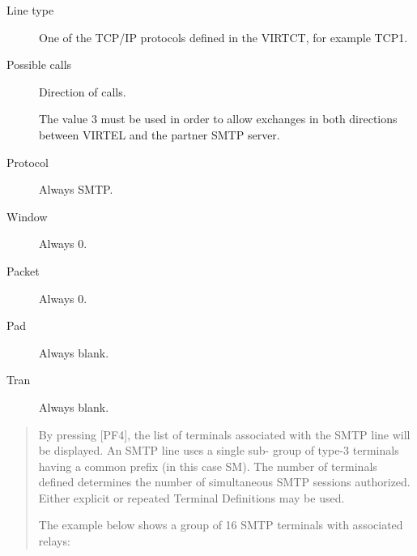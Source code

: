 \documentclass[letterpaper,10pt,english]{sphinxmanual}
\begin{document}
\begin{description}
\item[{Line type}] \leavevmode
One of the TCP/IP protocols defined in the VIRTCT, for example TCP1.

\item[{Possible calls}] \leavevmode
Direction of calls.

The value 3 must be used in order to allow exchanges in both directions between VIRTEL and the partner SMTP server.

\item[{Protocol}] \leavevmode
Always SMTP.

\item[{Window}] \leavevmode
Always 0.

\item[{Packet}] \leavevmode
Always 0.

\item[{Pad}] \leavevmode
Always blank.

\item[{Tran}] \leavevmode
Always blank.

\end{description}

\begin{quote}

By pressing {[}PF4{]}, the list of terminals associated with the SMTP line will be displayed. An SMTP line uses a single sub- group of type-3 terminals having a common prefix (in this case SM). The number of terminals defined determines the number of simultaneous SMTP sessions authorized. Either explicit or repeated Terminal Definitions may be used.

The example below shows a group of 16 SMTP terminals with associated relays:
\end{quote}


\ignorespaces 
\end{document}
